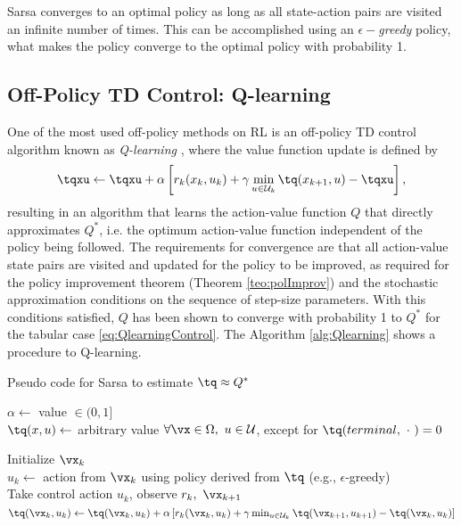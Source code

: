 Sarsa converges to an optimal policy as long as all state-action pairs are visited an infinite number of times. This can be accomplished using an $\epsilon-$\textit{greedy} policy, what makes the policy converge to the optimal policy with probability 1.

\subsection{Off-Policy TD Control: Q-learning} 
\label{sec:qlearning}

One of the most used off-policy methods on RL is an off-policy TD control algorithm known as \textit{Q-learning} \citep{watkins1989}, where the value function update is defined by
\begin{equation}
  \tqxu \gets \tqxu + \alpha\left[r_k(x_k,u_k) + \gamma \min_{u\in \mathcal{U}_k} \tq(x_{k+1},u) - \tqxu \right]
  \label{eq:QlearningControl},
\end{equation}
resulting in an algorithm that learns the action-value function $Q$ that directly approximates $Q^*$, i.e. the optimum action-value function independent of the policy being followed. The requirements for convergence are that all action-value state pairs are visited and updated for the policy to be improved, as required for the policy improvement theorem (Theorem \ref{teo:polImprov}) and the stochastic approximation conditions on the sequence of step-size parameters. With this conditions satisfied, $Q$ has been shown to converge with probability 1 to  $Q^*$ for the tabular case \eqref{eq:QlearningControl}. The Algorithm \ref{alg:Qlearning} shows a procedure to Q-learning.

\begin{algorithm} %
  \caption{Pseudo code for Sarsa to estimate $\tq \approx Q^*$ }\label{alg:Qlearning}
  \DontPrintSemicolon

  $\alpha \gets $ value $\in (0,1]$ \\
  $\tq(x,u) \gets$ arbitrary value $\forall \vx \in \Omega,\ u \in \mathcal{U}$, except for $\tq(terminal,\ \cdot\ ) = 0$

  {
    Initialize $\vx_k$ \\
    {
      $u_{k} \gets$ action from $\vx_k$ using policy derived from $\tq$ (e.g.,  $\epsilon$-greedy) \\
      Take control action $u_k$, observe $r_k,\ \vx_{k+1}$ \\
      $\tq(\vx_k,u_k) \gets \tq(\vx_k,u_k) + \alpha\left[r_k(\vx_k,u_k) + \gamma \min_{u \in \mathcal{U}_k} \tq(\vx_{k+1},u_{k+1}) - \tq(\vx_k,u_k)\right]$ \\
    }
  }
\end{algorithm}

